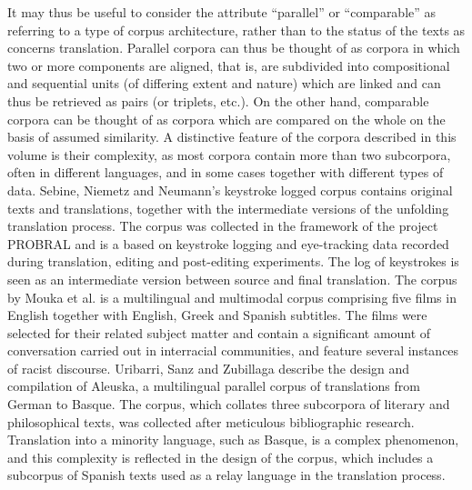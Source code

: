 \begin{refsection}
It may thus be useful to consider the attribute “parallel” or “comparable” as referring to a type of corpus architecture, rather than to the status of the texts as concerns translation. Parallel corpora can thus be thought of as corpora in which two or more components are aligned, that is, are subdivided into compositional and sequential units (of differing extent and nature) which are linked and can thus be retrieved as pairs (or triplets, etc.). On the other hand, comparable corpora can be thought of as corpora which are compared on the whole on the basis of assumed similarity.
A distinctive feature of the corpora described in this volume is their complexity, as most corpora contain more than two subcorpora, often in different languages, and in some cases together with different types of data. Sebine, Niemetz and Neumann’s keystroke logged corpus contains original texts and translations, together with the intermediate versions of the unfolding translation process. The corpus was collected in the framework of the project PROBRAL and is a based on keystroke logging and eye-tracking data recorded during translation, editing and post-editing experiments. The log of keystrokes is seen as an intermediate version between source and final translation. The corpus by Mouka et al. is a multilingual and multimodal corpus comprising five films in English together with English, Greek and Spanish subtitles. The films were selected for their related subject matter and contain a significant amount of conversation carried out in interracial communities, and feature several instances of racist discourse. Uribarri, Sanz and Zubillaga describe the design and compilation of Aleuska, a multilingual parallel corpus of translations from German to Basque. The corpus, which collates three subcorpora of literary and philosophical texts, was collected after meticulous bibliographic research. Translation into a minority language, such as Basque, is a complex phenomenon, and this complexity is reflected in the design of the corpus, which includes a subcorpus of Spanish texts used as a relay language in the translation process.


\end{refsection}
